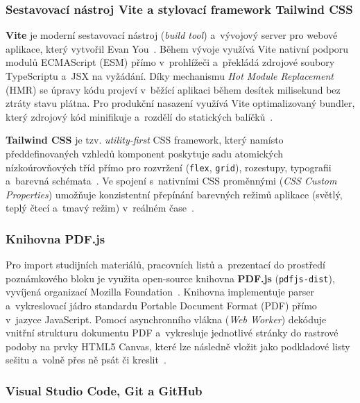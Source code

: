 \documentclass[12pt, a4paper, oneside]{article}
\begin{document}
\subsubsection{Sestavovací nástroj Vite a stylovací framework Tailwind CSS}
\label{sec:teorie_vite_tailwind}

\textbf{Vite} je moderní sestavovací nástroj (\textit{build tool}) a~vývojový server pro webové aplikace, který vytvořil Evan You~\cite{vite_docs}. Během vývoje využívá Vite nativní podporu modulů ECMAScript (ESM) přímo v~prohlížeči a~překládá zdrojové soubory TypeScriptu a~JSX na vyžádání. Díky mechanismu \textit{Hot Module Replacement} (HMR) se úpravy kódu projeví v~běžící aplikaci během desítek milisekund bez ztráty stavu plátna. Pro produkční nasazení využívá Vite optimalizovaný bundler, který zdrojový kód minifikuje a~rozdělí do statických balíčků~\cite{vite_docs}.

\textbf{Tailwind CSS} je tzv. \textit{utility-first} CSS framework, který namísto předdefinovaných vzhledů komponent poskytuje sadu atomických nízkoúrovňových tříd přímo pro rozvržení (\texttt{flex}, \texttt{grid}), rozestupy, typografii a~barevná schémata~\cite{tailwind_docs}. Ve spojení s~nativními CSS proměnnými (\textit{CSS Custom Properties}) umožňuje konzistentní přepínání barevných režimů aplikace (světlý, teplý čtecí a~tmavý režim) v~reálném čase~\cite{tailwind_docs}.

\subsubsection{Knihovna PDF.js}
\label{sec:teorie_pdfjs}

Pro import studijních materiálů, pracovních listů a~prezentací do prostředí poznámkového bloku je využita open-source knihovna \textbf{PDF.js} (\texttt{pdfjs-dist}), vyvíjená organizací Mozilla Foundation~\cite{pdfjs_docs}. Knihovna implementuje parser a~vykreslovací jádro standardu Portable Document Format (PDF) přímo v~jazyce JavaScript. Pomocí asynchronního vlákna (\textit{Web Worker}) dekóduje vnitřní strukturu dokumentu PDF a~vykresluje jednotlivé stránky do rastrové podoby na prvky HTML5 Canvas, které lze následně vložit jako podkladové listy sešitu a~volně přes ně psát či kreslit~\cite{pdfjs_docs}.

\subsubsection{Visual Studio Code, Git a GitHub}
\label{sec:teorie_vscode_git}
\end{document}
